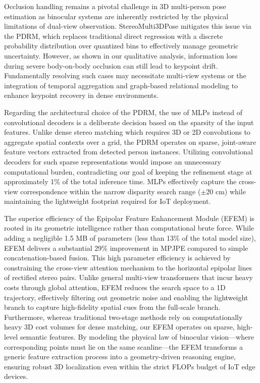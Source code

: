 \documentclass[journal]{IEEEtran}
\begin{document}
Occlusion handling remains a pivotal challenge in 3D multi-person pose estimation as binocular systems are inherently restricted by the physical limitations of dual-view observation. StereoMulti3DPose mitigates this issue via the PDRM, which replaces traditional direct regression with a discrete probability distribution over quantized bins to effectively manage geometric uncertainty. However, as shown in our qualitative analysis, information loss during severe body-on-body occlusion can still lead to keypoint drift. Fundamentally resolving such cases may necessitate multi-view systems or the integration of temporal aggregation and graph-based relational modeling to enhance keypoint recovery in dense environments.

Regarding the architectural choice of the PDRM, the use of MLPs instead of convolutional decoders is a deliberate decision based on the sparsity of the input features. Unlike dense stereo matching which requires 3D or 2D convolutions to aggregate spatial contexts over a grid, the PDRM operates on sparse, joint-aware feature vectors extracted from detected person instances. Utilizing convolutional decoders for such sparse representations would impose an unnecessary computational burden, contradicting our goal of keeping the refinement stage at approximately 1\% of the total inference time. MLPs effectively capture the cross-view correspondence within the narrow disparity search range ($\pm$20 cm) while maintaining the lightweight footprint required for IoT deployment.

The superior efficiency of the Epipolar Feature Enhancement Module (EFEM) is rooted in its geometric intelligence rather than computational brute force. While adding a negligible 1.5 MB of parameters (less than 13\% of the total model size), EFEM delivers a substantial 29\% improvement in MPJPE compared to simple concatenation-based fusion. This high parameter efficiency is achieved by constraining the cross-view attention mechanism to the horizontal epipolar lines of rectified stereo pairs. Unlike general multi-view transformers that incur heavy costs through global attention, EFEM reduces the search space to a 1D trajectory, effectively filtering out geometric noise and enabling the lightweight branch to capture high-fidelity spatial cues from the full-scale branch. Furthermore, whereas traditional two-stage methods rely on computationally heavy 3D cost volumes for dense matching, our EFEM operates on sparse, high-level semantic features. By modeling the physical law of binocular vision—where corresponding points must lie on the same scanline—the EFEM transforms a generic feature extraction process into a geometry-driven reasoning engine, ensuring robust 3D localization even within the strict FLOPs budget of IoT edge devices.
\end{document}
